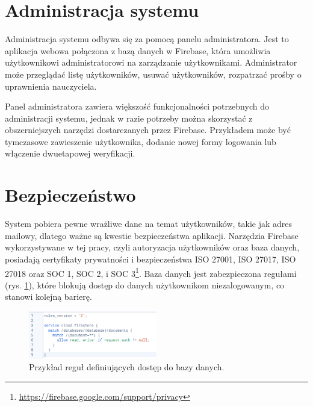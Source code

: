 \documentclass[a4paper,twoside,12pt]{book}
\begin{document}

\section{Administracja systemu}

Administracja systemu odbywa się za pomocą panelu administratora. Jest to aplikacja webowa połączona z bazą danych w Firebase, która umożliwia użytkownikowi  administratorowi na zarządzanie użytkownikami. Administrator może przeglądać listę użytkowników, usuwać użytkowników, rozpatrzać prośby o uprawnienia nauczyciela. 

Panel administratora zawiera większość funkcjonalności potrzebnych do administracji systemu, jednak w razie potrzeby można skorzystać z obszerniejszych narzędzi dostarczanych przez Firebase. Przykładem może być tymczasowe zawieszenie użytkownika, dodanie nowej formy logowania lub włączenie dwuetapowej weryfikacji.

\section{Bezpieczeństwo}

System pobiera pewne wrażliwe dane na temat użytkowników, takie jak adres mailowy, dlatego ważne są kwestie bezpieczeństwa aplikacji. Narzędzia Firebase wykorzystywane w tej pracy, czyli autoryzacja użytkowników oraz baza danych, posiadają certyfikaty prywatności i bezpieczeństwa ISO 27001, ISO 27017, ISO 27018 oraz SOC 1, SOC 2, i SOC 3\footnote{\url{https://firebase.google.com/support/privacy}}. 
Baza danych jest zabezpieczona regułami (rys. \ref{fig:rules}), które blokują dostęp do danych użytkownikom niezalogowanym, co stanowi kolejną barierę.

\begin{figure}[]
\centering
\includegraphics[width=0.5\textwidth]{Firestore}
\caption{Przykład reguł definiujących dostęp do bazy danych.}
\label{fig:rules}
\end{figure}
\end{document}
